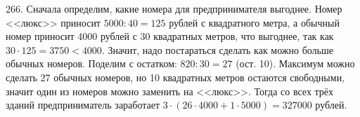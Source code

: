 266. Сначала определим, какие номера для предпринимателя выгоднее. Номер <<люкс>> приносит $5000:40=125$ рублей с квадратного метра, а обычный номер приносит 4000 рублей с 30 квадратных метров, что выгоднее, так как $30\cdot125=3750<4000.$ Значит, надо постараться сделать как можно больше обычных номеров. Поделим с остатком: $820:30=27$ (ост. 10). Максимум можно сделать 27 обычных номеров, но 10 квадратных метров остаются свободными, значит один из номеров можно заменить на <<люкс>>. Тогда со всех трёх зданий предприниматель заработает $3\cdot(26\cdot4000+1\cdot5000)=327000$ рублей.\\
